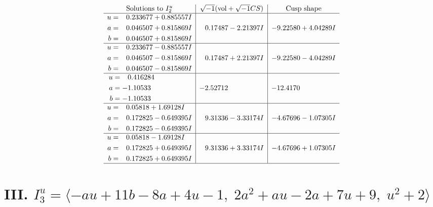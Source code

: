 \documentclass[1p]{elsarticle_modified}
\theoremstyle{definition}
\newcommand{\I}{\sqrt{-1}}
\begin{document}
$$\begin{array}{c|c|c}  
\text{Solutions to }I^u_{2}& \I (\text{vol} + \sqrt{-1}CS) & \text{Cusp shape}\\
 \hline 
\begin{aligned}
u &= \phantom{-}0.233677 + 0.885557 I \\
a &= \phantom{-}0.046507 + 0.815869 I \\
b &= \phantom{-}0.046507 + 0.815869 I\end{aligned}
 & \phantom{-}0.17487 - 2.21397 I & -9.22580 + 4.04289 I \\ \hline\begin{aligned}
u &= \phantom{-}0.233677 - 0.885557 I \\
a &= \phantom{-}0.046507 - 0.815869 I \\
b &= \phantom{-}0.046507 - 0.815869 I\end{aligned}
 & \phantom{-}0.17487 + 2.21397 I & -9.22580 - 4.04289 I \\ \hline\begin{aligned}
u &= \phantom{-}0.416284\phantom{ +0.000000I} \\
a &= -1.10533\phantom{ +0.000000I} \\
b &= -1.10533\phantom{ +0.000000I}\end{aligned}
 & -2.52712\phantom{ +0.000000I} & -12.4170\phantom{ +0.000000I} \\ \hline\begin{aligned}
u &= \phantom{-}0.05818 + 1.69128 I \\
a &= \phantom{-}0.172825 - 0.649395 I \\
b &= \phantom{-}0.172825 - 0.649395 I\end{aligned}
 & \phantom{-}9.31336 - 3.33174 I & -4.67696 - 1.07305 I \\ \hline\begin{aligned}
u &= \phantom{-}0.05818 - 1.69128 I \\
a &= \phantom{-}0.172825 + 0.649395 I \\
b &= \phantom{-}0.172825 + 0.649395 I\end{aligned}
 & \phantom{-}9.31336 + 3.33174 I & -4.67696 + 1.07305 I\\
 \hline 
 \end{array}$$\newpage\newpage\renewcommand{\arraystretch}{1}
\centering \section*{III. $I^u_{3}= \langle - a u+11 b-8 a+4 u-1,\;2 a^2+a u-2 a+7 u+9,\;u^2+2 \rangle$}
\end{document}
